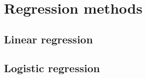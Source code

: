 \documentclass[../main.tex]{subfiles}
\begin{document}
\section{Regression methods}

\subsection{Linear regression}

\subsection{Logistic regression}
\end{document}
